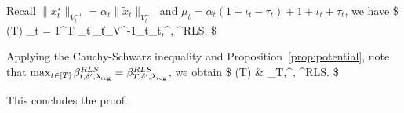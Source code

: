 Recall $\|x^{\star}_t\|_{V^{-1}_t} = \alpha_t \|\tilde{x}_t\|_{V^{-1}_t}$ and $\mu_t  =  \alpha_t(1+\iota_t -\tau_t)+1+\iota_t+\tau_t$, we have 
\$
\cR(T)  \leq \sum_{t = 1}^T   \mu_t \|_t\|_{V^{-1}_t}\beta_{t,\delta^\prime, \lambdareg}^{RLS}.
\$ 

Applying the Cauchy-Schwarz inequality and Proposition~\ref{prop:potential}, note that $\max_{t\in[T]}  \beta_{t,\delta^\prime, \lambda_{\text{reg}}}^{RLS} = \beta_{T,\delta^\prime, \lambda_{\text{reg}}}^{RLS}$, we obtain 
\$
\cR(T) &\leq   {}  \leq {}    \beta_{T,\delta^\prime, \lambdareg}^{RLS}.
\$


This concludes the proof.
\endproof


